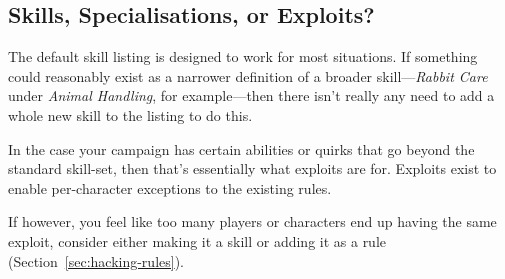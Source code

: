 \subsection{Skills, Specialisations, or Exploits?}
The default skill listing is designed to work for most situations.
If something could reasonably exist as a narrower definition of a broader skill---\textit{Rabbit Care} under \textit{Animal Handling}, for example---then there isn't really any need to add a whole new skill to the listing to do this.

In the case your campaign has certain abilities or quirks that go beyond the standard skill-set, then that's essentially what exploits are for.
Exploits exist to enable per-character exceptions to the existing rules.

If however, you feel like too many players or characters end up having the same exploit, consider either making it a skill or adding it as a rule (Section~\ref{sec:hacking-rules}).